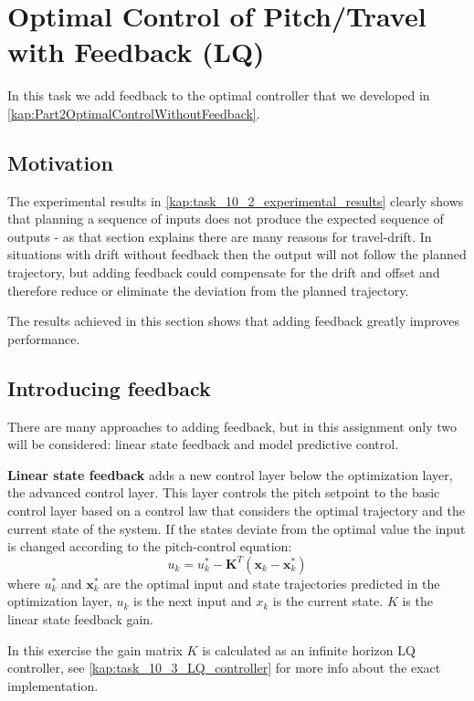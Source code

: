 \documentclass[../main.tex]{subfiles}
\begin{document}
\section{Optimal Control of Pitch/Travel with Feedback (LQ)}
In this task we add feedback to the optimal controller that we developed in \cref{kap:Part2OptimalControlWithoutFeedback}.

\subsection{Motivation}
The experimental results in \cref{kap:task_10_2_experimental_results} clearly shows that planning a sequence of inputs does not produce the expected sequence of outputs - as that section explains there are many reasons for travel-drift. In situations with drift without feedback then the output will not follow the planned trajectory, but adding feedback could compensate for the drift and offset and therefore reduce or eliminate the deviation from the planned trajectory.

The results achieved in this section shows that adding feedback greatly improves performance.

\subsection{Introducing feedback}
There are many approaches to adding feedback, but in this assignment only two will be considered: linear state feedback and model predictive control.

\textbf{Linear state feedback} adds a new control layer below the optimization layer, the advanced control layer. This layer controls the pitch setpoint to the basic control layer based on a control law that considers the optimal trajectory and the current state of the system. If the states deviate from the optimal value the input is changed according to the pitch-control equation:
\begin{equation}\label{eq:lab3_feedback}
	u_k = u_k^* - \bm{K}^T(\bm x_k - \bm x_k^*)
\end{equation}
where $u_k^*$ and $\bm x_k^*$ are the optimal input and state trajectories predicted in the optimization layer, $u_k$ is the next input and $x_k$ is the current state. $K$ is the linear state feedback gain. 

In this exercise the gain matrix $K$ is calculated as an infinite horizon LQ controller, see \cref{kap:task_10_3_LQ_controller} for more info about the exact implementation.
\end{document}

